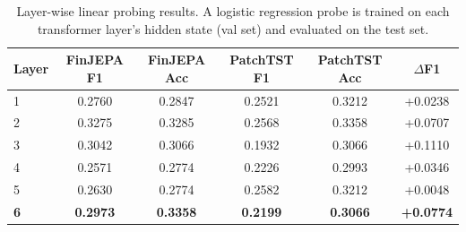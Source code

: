 \begin{table}[t]
\centering
\small
\caption{Layer-wise linear probing results. A logistic regression probe is trained on each transformer layer's hidden state (val set) and evaluated on the test set.}
\label{tab:layerwise}
\begin{tabular}{lccccc}
\toprule
Layer & FinJEPA F1 & FinJEPA Acc & PatchTST F1 & PatchTST Acc & $\Delta$F1 \\
\midrule
  1 & 0.2760 & 0.2847 & 0.2521 & 0.3212 & +0.0238 \\
  2 & 0.3275 & 0.3285 & 0.2568 & 0.3358 & +0.0707 \\
  3 & 0.3042 & 0.3066 & 0.1932 & 0.3066 & +0.1110 \\
  4 & 0.2571 & 0.2774 & 0.2226 & 0.2993 & +0.0346 \\
  5 & 0.2630 & 0.2774 & 0.2582 & 0.3212 & +0.0048 \\
  \textbf{6} & \textbf{0.2973} & \textbf{0.3358} & \textbf{0.2199} & \textbf{0.3066} & \textbf{+0.0774} \\
\bottomrule
\end{tabular}
\end{table}
